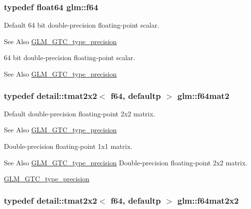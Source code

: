\hypertarget{group__gtc__type__precision_ga2bba392e555124b36cde6abba349bab3}{
\subsubsection[{f64}]{\setlength{\rightskip}{0pt plus 5cm}typedef float64 {\bf glm\-::f64}}}\label{group__gtc__type__precision_ga2bba392e555124b36cde6abba349bab3}
Default 64 bit double-\/precision floating-\/point scalar. \begin{DoxySeeAlso}{See Also}
\hyperlink{group__gtc__type__precision}{G\-L\-M\-\_\-\-G\-T\-C\-\_\-type\-\_\-precision}
\end{DoxySeeAlso}
64 bit double-\/precision floating-\/point scalar. \begin{DoxySeeAlso}{See Also}
\hyperlink{group__gtc__type__precision}{G\-L\-M\-\_\-\-G\-T\-C\-\_\-type\-\_\-precision} 
\end{DoxySeeAlso}
\hypertarget{group__gtc__type__precision_gaa66040c1fd82a9d1f6ac82d4e1e8baa6}{
\subsubsection[{f64mat2}]{\setlength{\rightskip}{0pt plus 5cm}typedef detail\-::tmat2x2$<$ f64, defaultp $>$ {\bf glm\-::f64mat2}}}\label{group__gtc__type__precision_gaa66040c1fd82a9d1f6ac82d4e1e8baa6}
Default double-\/precision floating-\/point 2x2 matrix. \begin{DoxySeeAlso}{See Also}
\hyperlink{group__gtc__type__precision}{G\-L\-M\-\_\-\-G\-T\-C\-\_\-type\-\_\-precision}
\end{DoxySeeAlso}
Double-\/precision floating-\/point 1x1 matrix. \begin{DoxySeeAlso}{See Also}
\hyperlink{group__gtc__type__precision}{G\-L\-M\-\_\-\-G\-T\-C\-\_\-type\-\_\-precision} Double-\/precision floating-\/point 2x2 matrix. 

\hyperlink{group__gtc__type__precision}{G\-L\-M\-\_\-\-G\-T\-C\-\_\-type\-\_\-precision} 
\end{DoxySeeAlso}
\hypertarget{group__gtc__type__precision_gad125d405392e76f26f359798350fb64f}{
\subsubsection[{f64mat2x2}]{\setlength{\rightskip}{0pt plus 5cm}typedef detail\-::tmat2x2$<$ f64, defaultp $>$ {\bf glm\-::f64mat2x2}}}\label{group__gtc__type__precision_gad125d405392e76f26f359798350fb64f}
